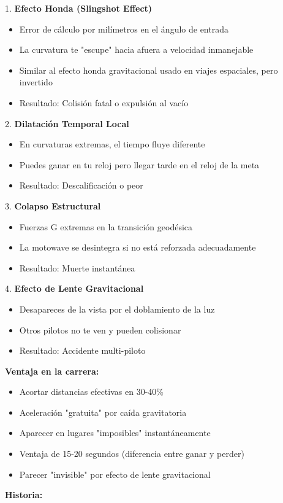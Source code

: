 \documentclass[11pt,a4paper]{report}
\begin{document}
1. \textbf{Efecto Honda (Slingshot Effect)}
\begin{itemize}
  \item Error de cálculo por milímetros en el ángulo de entrada
  \item La curvatura te "escupe" hacia afuera a velocidad inmanejable
  \item Similar al efecto honda gravitacional usado en viajes espaciales, pero invertido
  \item Resultado: Colisión fatal o expulsión al vacío

\end{itemize}
2. \textbf{Dilatación Temporal Local}
\begin{itemize}
  \item En curvaturas extremas, el tiempo fluye diferente
  \item Puedes ganar en tu reloj pero llegar tarde en el reloj de la meta
  \item Resultado: Descalificación o peor

\end{itemize}
3. \textbf{Colapso Estructural}
\begin{itemize}
  \item Fuerzas G extremas en la transición geodésica
  \item La motowave se desintegra si no está reforzada adecuadamente
  \item Resultado: Muerte instantánea

\end{itemize}
4. \textbf{Efecto de Lente Gravitacional}
\begin{itemize}
  \item Desapareces de la vista por el doblamiento de la luz
  \item Otros pilotos no te ven y pueden colisionar
  \item Resultado: Accidente multi-piloto

\end{itemize}
\textbf{Ventaja en la carrera:}

\begin{itemize}
  \item Acortar distancias efectivas en 30-40\%
  \item Aceleración "gratuita" por caída gravitatoria
  \item Aparecer en lugares "imposibles" instantáneamente
  \item Ventaja de 15-20 segundos (diferencia entre ganar y perder)
  \item Parecer "invisible" por efecto de lente gravitacional

\end{itemize}
\textbf{Historia:}
\end{document}
